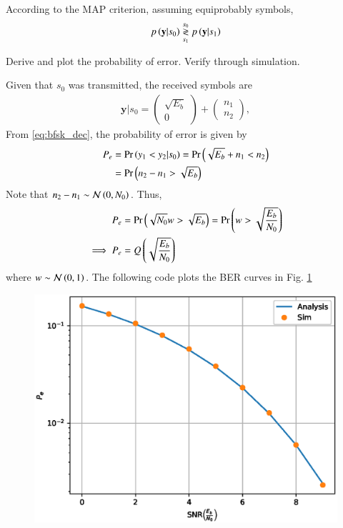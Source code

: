 \documentclass[journal,12pt,twocolumn]{IEEEtran}
\begin{document}
\solution According to the MAP criterion, assuming equiprobably symbols,
\begin{align}
p\left(\mathbf{y}|s_0\right) \overset{s_0}{\underset{s_1}{\gtrless}} p\left(\mathbf{y}|s_1\right)
\end{align}
\begin{problem}
Derive and plot the probability of error.  Verify through simulation.
\end{problem}
\solution Given that $s_0$ was transmitted, the received symbols are
\begin{align}
\mathbf{y}|s_0 = 
\begin{pmatrix*}
\sqrt{E_b} \\
0
\end{pmatrix*}
+
\begin{pmatrix*}
 n_{1}\\
n_{2}
\end{pmatrix*},
\end{align}
From \eqref{eq:bfsk_dec}, 
the probability of error is given by
\begin{align}
P_e &= \Pr\left(y_1 < y_2|s_0\right) = \Pr\left(\sqrt{E_b} + n_1 < n_2\right)
\\
&= \Pr\left( n_2-n_1 > \sqrt{E_b} \right) 
\label{eq:bfsk_proof_n0}
\end{align}
Note that $n_2-n_1 \sim \mathcal{N}\left(0,N_0\right)$. Thus, 
\begin{align}
P_e &= \Pr\left( \sqrt{N_0}w > \sqrt{E_b} \right)  =  \Pr\left( w > \sqrt{\frac{E_b}{N_0}} \right)
\\
\implies 
P_e & = Q\left(\sqrt{\frac{E_b}{N_0}}\right)
\end{align}
where 
$w \sim \mathcal{N}\left(0,1\right)$.  
%
The following code plots the BER curves in Fig. \ref{fig:bfsk_ber}

%
\begin{figure}[!h]
\centering
\includegraphics[width=\columnwidth]{./figs/bfsk_ber.eps}
\caption{}
\label{fig:bfsk_ber}
\end{figure}
\end{document}
